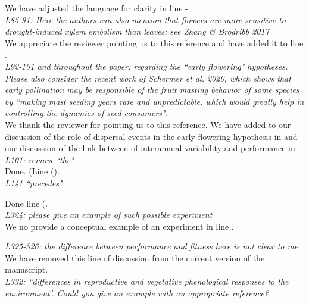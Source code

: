 \documentclass{article}[11pt]
\begin{document}
\noindent  We have adjusted the language for clarity in line -.\\

\emph{L85-91: Here the authors can also mention that flowers are more sensitive to drought-induced xylem embolism than leaves: see Zhang \& Brodribb 2017}\\

\noindent We appreciate the reviewer pointing us to this reference and have added it to line .\\

\emph{L92-101 and throughout the paper: regarding the ``early flowering" hypotheses. Please also consider the recent work of Schermer et al. 2020, which shows that early pollination may be responsible of the fruit masting behavior of some species by ``making mast seeding years rare and unpredictable, which would greatly help in controlling the dynamics of seed consumers".}\\

\noindent We thank the reviewer for pointing us to this reference. We have added to our discussion of the role of dispersal events in the early flowering hypothesis in  and our discussion of the link between of interannual variability and performance in .\\

\emph{L101: remove `the"}\\

Done. (Line ().\\

\emph{L141 ``precedes"}

Done line (.\\

\emph{L324: please give an example of such possible experiment}\\

\noindent We no provide a conceptual example of an experiment in line .

\emph{L325-326: the difference between performance and fitness here is not clear to me}\\

\noindent We have removed this line of discussion from the current version of the manuscript.\\

\emph{L332: ``differences in reproductive and vegetative phenological responses to the environment'. Could you give an example with an appropriate reference?}\\
\end{document}
